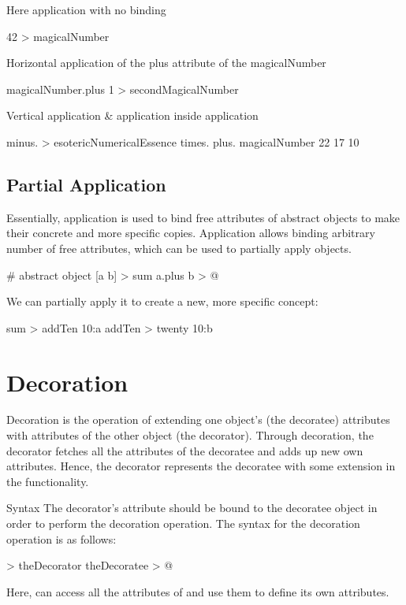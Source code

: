 \documentclass[12pt]{book}
\begin{document}
Here application with no binding
\begin{ffcode}
42 > magicalNumber
\end{ffcode}
Horizontal application of the plus attribute of the magicalNumber
\begin{ffcode}
magicalNumber.plus 1 > secondMagicalNumber
\end{ffcode}
Vertical application \& application inside application
\begin{ffcode}
minus. > esotericNumericalEssence
  times.
    plus.
      magicalNumber
      22
    17
  10
\end{ffcode}

\subsection{Partial Application}

Essentially, application is used to bind free attributes of abstract objects to make their concrete and more specific copies. Application allows binding arbitrary number of free attributes, which can be used to partially apply objects.

\begin{ffcode}
# abstract object
[a b] > sum
  a.plus b > @
\end{ffcode}
We can partially apply it to create a new, more specific concept:
\begin{ffcode}
sum > addTen
  10:a
addTen > twenty
  10:b
\end{ffcode}

\section{Decoration}
Decoration is the operation of extending one object's (the decoratee) attributes with attributes of the other object (the decorator). Through decoration, the decorator fetches all the attributes of the decoratee and adds up new own attributes. Hence, the decorator represents the decoratee with some extension in the functionality.

Syntax
The decorator's  attribute should be bound to the decoratee object in order to perform the decoration operation.
The syntax for the decoration operation is as follows:

\begin{ffcode}
[] > theDecorator
  theDecoratee > @
\end{ffcode}
Here,  can access all the attributes of  and use them to define its own attributes.
\end{document}
